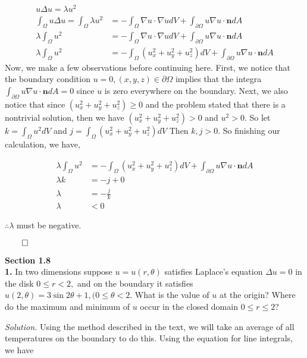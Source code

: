 \documentclass{article}
\begin{document}
\begin{align*}
u \Delta u = \lambda u^2 &  \\
\int_\Omega u \Delta u =\int_\Omega \lambda u^2 &=  - \int_\Omega \nabla u \cdot \nabla u dV+\int_{\partial \Omega} u \nabla u \cdot \textbf{n} dA\\
\lambda  \int_\Omega u^2 &=  - \int_\Omega \nabla u \cdot \nabla u dV+\int_{\partial \Omega} u \nabla u \cdot \textbf{n} dA \\
\lambda  \int_\Omega u^2 &=  - \int_\Omega (u_{x}^2+ u_{y}^2+u_{z}^2) dV+\int_{\partial \Omega} u \nabla u \cdot \textbf{n} dA
\end{align*}
Now, we make a few observations before continuing here. First, we notice that the boundary condition \(u = 0 , (x,y,z) \in \partial \Omega \) implies that the integra \( \int_{\partial \Omega} u \nabla u \cdot \textbf{n} dA=0\) since \(u\) is zero everywhere on the boundary. Next, we also notice that since \( (u_{x}^2+ u_{y}^2+u_{z}^2)\geq 0\) and the problem stated that there is a nontrivial solution, then we have \( (u_{x}^2+ u_{y}^2+u_{z}^2)> 0\) and \(u^2 >0\). So let \(k =  \int_\Omega u^2 dV\) and \(j=\int_\Omega (u_{x}^2+ u_{y}^2+u_{z}^2) dV\) Then \(k,j >0\). So finishing our calculation, we have, 

\begin{align*}
\lambda  \int_\Omega u^2 &=  - \int_\Omega (u_{x}^2+ u_{y}^2+u_{z}^2) dV+\int_{\partial \Omega} u \nabla u \cdot \textbf{n} dA\\
\lambda  k &=  - j+0\\
\lambda &= -\frac{j}{k} \\
\lambda & < 0
\end{align*}

\( \therefore  \lambda \) must be negative. 
\begin{flushright}
\( \qed \)
\end{flushright}

\newpage
\textbf{Section 1.8} \\
\textbf{1.} In two dimensions suppose \(u = u(r,\theta) \) satisfies Laplace's equation \( \Delta u = 0 \) in the disk \( 0 \leq r <2, \) and on the boundary it satisfies \(u(2,\theta)=3\sin 2\theta +1, (0 \leq \theta <2\). What is the value of \(u\) at the origin? Where do the maximum and minimum of \(u\) occur in the closed domain \(0 \leq r \leq 2\)?

\vspace{3mm}

\textit{Solution.} Using the method described in the text, we will take an average of all temperatures on the boundary to do this. Using the equation for line integrals, we have
\end{document}
